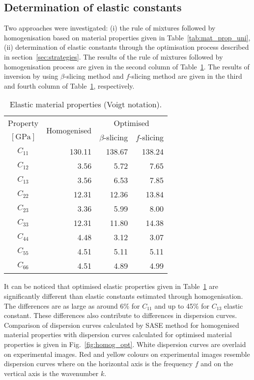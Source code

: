 \documentclass[preprint,12pt]{elsarticle}
\begin{document}
\subsection{Determination of elastic constants}
Two approaches were investigated: (i) the rule of mixtures followed by homogenisation based on material properties given in Table~\ref{tab:mat_prop_uni}, (ii) determination of elastic constants through the optimisation process described in section~\ref{sec:strategies}. 
The results of the rule of mixtures followed by homogenisation process are given in the second column of Table~\ref{tab:mat_prop_identified}.
The results of inversion by using $\beta$-slicing method and $f$-slicing method are given in the third and fourth column of Table~\ref{tab:mat_prop_identified}, respectively.
\begin{table}[h]
	\renewcommand{\arraystretch}{1.3}
	\centering \footnotesize
	\caption{Elastic material properties (Voigt notation).}
	\begin{tabular}{crrr} 
		\toprule
		Property & \multirow{2}{*}{Homogenised} & \multicolumn{2}{c}{Optimised}\\
		\cmidrule(lr){3-4}
		$\left[\textrm{GPa}\right]$ &  & $\beta$-slicing & $f$-slicing \\ 
		\midrule 
		$C_{11}$ & 130.11 & 138.67 & 138.24 \\ 
		$C_{12}$ & 3.56   & 5.72   & 7.65\\ 
		$C_{13}$ & 3.56   & 6.53   & 7.85\\
		$C_{22}$ & 12.31  & 12.36  & 13.84\\
		$C_{23}$ & 3.36   & 5.99  & 8.00\\
		$C_{33}$ & 12.31  & 11.80 & 14.38\\
		$C_{44}$ & 4.48   & 3.12  & 3.07\\
		$C_{55}$ & 4.51   & 5.11  & 5.11\\
		$C_{66}$ & 4.51   & 4.89  & 4.99 \\
		\bottomrule
	\end{tabular} 
	\label{tab:mat_prop_identified}
\end{table}
It can be noticed that optimised elastic properties given in Table~\ref{tab:mat_prop_identified} are significantly different than elastic constants estimated through homogenisation. 
The differences are as large as around 6\% for $C_{11}$ and up to 45\% for $C_{13}$ elastic constant.
These differences also contribute to differences in dispersion curves. 
Comparison of dispersion curves calculated by SASE method for homogenised material properties with dispersion curves calculated for optimised material properties is given in Fig.~\ref{fig:homog_opt}. 
White dispersion curves are overlaid on experimental images. 
Red and yellow colours on experimental images resemble dispersion curves where on the horizontal axis is the frequency $f$ and on the vertical axis is the wavenumber $k$. 
\end{document}
